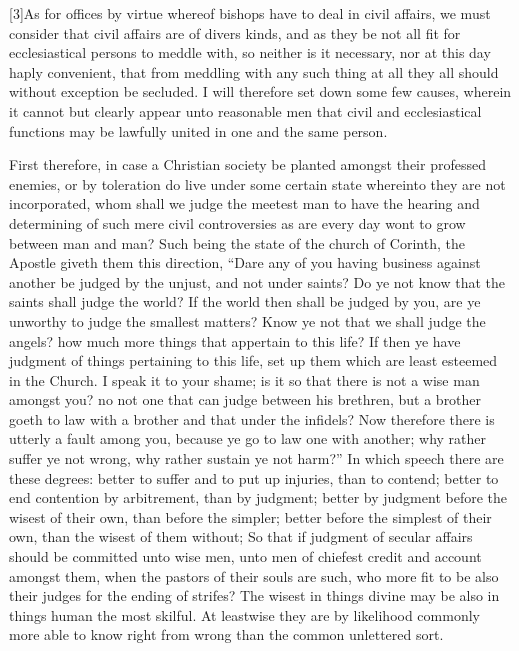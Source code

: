 [3]As for offices by virtue whereof bishops have to deal in civil affairs, we must consider that civil affairs are of divers  kinds, and as they be not all fit for ecclesiastical persons to meddle with, so neither is it necessary, nor at this day haply convenient, that from meddling with any such thing at all they all should without exception be secluded. I will therefore set down some few causes, wherein it cannot but clearly appear unto reasonable men that civil and ecclesiastical functions may be lawfully united in one and the same person.

First therefore, in case a Christian society be planted amongst their professed enemies, or by toleration do live under some certain state whereinto they are not incorporated, whom shall we judge the meetest man to have the hearing and determining of such mere civil controversies as are every day wont to grow between man and man? Such being the state of the church of Corinth, the Apostle giveth them this direction, “Dare any of you having business against another be judged by the unjust, and not under saints? Do ye not know that the saints shall judge the world? If the world then shall be judged by you, are ye unworthy to judge the smallest matters? Know ye not that we shall judge the angels? how much more things that appertain to this life? If then ye have judgment of things pertaining to this life, set up them which are least esteemed in the Church. I speak it to your shame; is it so that there is not a wise man amongst you? no not one that can judge between his brethren, but a brother goeth to law with a brother and that under the infidels? Now therefore there is utterly a fault among you, because ye go to law one with another; why rather suffer ye not wrong, why rather sustain ye not harm?” In which speech there are these degrees: better to suffer and to put up injuries, than to contend; better to end contention by arbitrement, than by judgment; better by judgment before the wisest of their own, than before the simpler; better before the simplest of their own, than the wisest of them without; So that if judgment of secular affairs should be committed unto wise men, unto men of chiefest credit and account amongst them, when the pastors of their souls are such, who more fit to be also their judges for the ending of strifes? The wisest in things divine may  be also in things human the most skilful. At leastwise they are by likelihood commonly more able to know right from wrong than the common unlettered sort.

